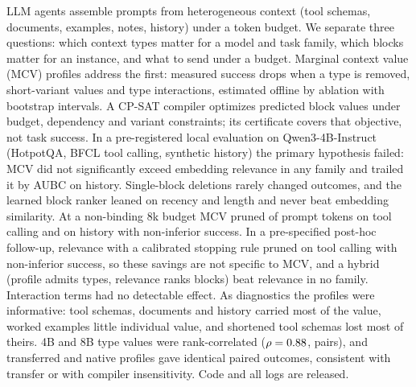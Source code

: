 LLM agents assemble prompts from heterogeneous context (tool schemas, documents, examples, notes, history) under a
token budget. We separate three questions: which context types matter for a model and task family, which blocks matter
for an instance, and what to send under a budget. Marginal context value (MCV) profiles address the first: measured
success drops when a type is removed, short-variant values and type interactions, estimated offline by ablation with
bootstrap intervals. A CP-SAT compiler optimizes predicted block values under budget, dependency and variant
constraints; its certificate covers that objective, not task success. In a pre-registered local evaluation on
Qwen3-4B-Instruct (HotpotQA, BFCL tool calling, synthetic history) the primary hypothesis failed: MCV did not
significantly exceed embedding relevance in any family and trailed it by \RHOneHistoryAbs{} AUBC on history.
Single-block deletions rarely changed outcomes, and the learned block ranker leaned on recency and length and never
beat embedding similarity. At a non-binding 8k budget MCV pruned \RTokCutTool of prompt tokens on tool calling and
\RTokCutHistory on history with non-inferior success. In a pre-specified post-hoc follow-up, relevance with a
calibrated stopping rule pruned \RTokCutStopTool on tool calling with non-inferior success, so these savings are not
specific to MCV, and a hybrid (profile admits types, relevance ranks blocks) beat relevance in no family. Interaction
terms had no detectable effect. As diagnostics the profiles were informative: tool schemas, documents and history
carried most of the value, worked examples little individual value, and shortened tool schemas lost most of theirs. 4B
and 8B type values were rank-correlated ($\rho=0.88$, \RRhoN pairs), and transferred and native profiles gave
identical paired outcomes, consistent with transfer or with compiler insensitivity. Code and all logs are released.
